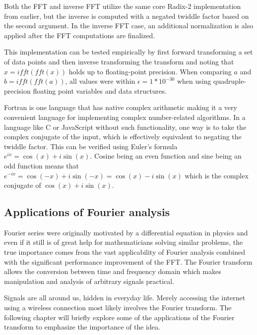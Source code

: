 

Both the FFT and inverse FFT utilize the same core Radix-2 implementation from earlier, but the inverse is computed with a negated twiddle factor based on the second argument. In the inverse FFT case, an additional normalization is also applied after the FFT computations are finalized.

This implementation can be tested empirically by first forward transforming a set of data points and then inverse transforming the transform and noting that $x = ifft(fft(x))$ holds up to floating-point precision. When comparing $a$ and $b = ifft(fft(a))$, all values were within $\epsilon = 1*10^{-30}$ when using quadruple-precision floating point variables and data structures.

Fortran is one language that has native complex arithmetic making it a very convenient language for implementing complex number-related algorithms. In a language like C or JavaScript without such functionality, one way is to take the complex conjugate of the input, which is effectively equivalent to negating the twiddle factor. This can be verified using Euler's formula $e^{ix} = \cos(x) + i\sin(x)$. Cosine being an even function and sine being an odd function means that $e^{-ix} = \cos(-x) + i\sin(-x) = \cos(x) - i\sin(x)$ which is the complex conjugate of $\cos(x) + i\sin(x)$. 

\subsection{Applications of Fourier analysis}
Fourier series were originally motivated by a differential equation in physics and even if it still is of great help for mathematicians solving similar problems, the true importance comes from the vast applicability of Fourier analysis combined with the significant performance improvement of the FFT. The Fourier transform allows the conversion between time and frequency domain which makes manipulation and analysis of arbitrary signals practical. 

Signals are all around us, hidden in everyday life. Merely accessing the internet using a wireless connection most likely involves the Fourier transform. The following chapter will briefly explore some of the applications of the Fourier transform to emphasize the importance of the idea. 



